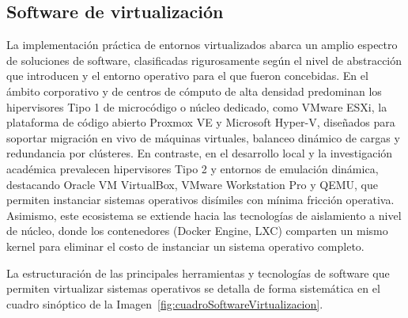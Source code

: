 \documentclass[12pt]{article}
\begin{document}
\subsection{Software de virtualización}\label{sec:softwareVirtualizacion}

La implementación práctica de entornos virtualizados abarca un amplio espectro de soluciones de software, clasificadas rigurosamente según el nivel de abstracción que introducen y el entorno operativo para el que fueron concebidas. En el ámbito corporativo y de centros de cómputo de alta densidad predominan los hipervisores Tipo 1 de microcódigo o núcleo dedicado, como VMware ESXi, la plataforma de código abierto Proxmox VE y Microsoft Hyper-V, diseñados para soportar migración en vivo de máquinas virtuales, balanceo dinámico de cargas y redundancia por clústeres. En contraste, en el desarrollo local y la investigación académica prevalecen hipervisores Tipo 2 y entornos de emulación dinámica, destacando Oracle VM VirtualBox, VMware Workstation Pro y QEMU, que permiten instanciar sistemas operativos disímiles con mínima fricción operativa. Asimismo, este ecosistema se extiende hacia las tecnologías de aislamiento a nivel de núcleo, donde los contenedores (Docker Engine, LXC) comparten un mismo kernel para eliminar el costo de instanciar un sistema operativo completo.

La estructuración de las principales herramientas y tecnologías de software que permiten virtualizar sistemas operativos se detalla de forma sistemática en el cuadro sinóptico de la Imagen~\ref{fig:cuadroSoftwareVirtualizacion}.
\end{document}
